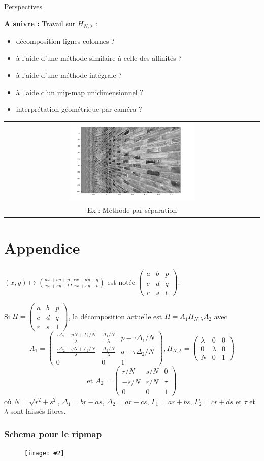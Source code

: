 \documentclass[c,12pt]{beamer}
\newcommand{\image}[2]{\begin{figure} \texttt{[image: \#2]}\end{figure}}
\newcommand{\matrice}[1]{\left(\begin{matrix} #1 \end{matrix}\right)}
\newcommand{\fram}[2]{\begin{frame} \frametitle{#1} #2 \end{frame}}
\begin{document}
     
\begin{frame}{Perspectives}

\textbf{A suivre :} Travail sur $H_{N,\lambda}$ :\\
	\begin{itemize}
                \item décomposition lignes-colonnes ?
                \item à l'aide d'une méthode similaire à celle des affinités ?
                \item à l'aide d'une méthode intégrale ?
                \item à l'aide d'un mip-map unidimensionnel ? 
                \item interprétation géométrique par caméra ?
                \end{itemize}
\begin{tabular}{c}
		\includegraphics[width=0.5\textwidth]{murhomographie.jpg}\\
                       {\small Ex : Méthode par séparation}
	\end{tabular}
\end{frame}






  \appendix
  \section{Appendice}
\fram{}{  $(x,y)\mapsto \left(\frac{ax+by+p}{rx+sy+t},\frac{cx+dy+q}{rx+sy+t}\right)$ est notée $\matrice{a&b&p\\c&d&q\\r&s&t}$. %
   
   Si $H = \matrice{a&b&p\\c&d&q\\r&s&1}$, la décomposition actuelle est $H=A_1H_{N,\lambda}A_2$ avec
   \[A_1 = \matrice{\frac{\tau\Delta_1-pN+\Gamma_1/N}{\lambda} & \frac{\Delta_1/N}{\lambda} & p-\tau\Delta_1/N\\ \frac{\tau\Delta_2-qN+\Gamma_2/N}{\lambda} & \frac{\Delta_2/N}{\lambda} & q-\tau\Delta_2/N\\ 0 & 0 & 1}, H_{N,\lambda} = \matrice{\lambda & 0 & 0\\0 & \lambda & 0\\N & 0 & 1} \]
   \[\text{et }A_2 = \matrice{r/N & s/N & 0\\-s/N & r/N & \tau\\0 & 0 & 1}\]
   où $N=\sqrt{r^2+s^2}$, $\Delta_1=br-as$, $\Delta_2=dr-cs$, $\Gamma_1 = ar+bs$, $\Gamma_2 = cr+ds$ et $\tau$ et $\lambda$ sont laissés libres.
   
   
  }
 
 \fram{Schema pour le ripmap}{\image{0.5}{pbripmap}}
 
\end{document}
